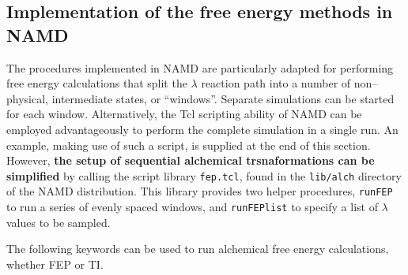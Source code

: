 \subsection{Implementation of the free energy methods in NAMD}
\label{section:fepparameters}


The procedures implemented in NAMD are particularly
adapted for performing free
energy calculations that split the $\lambda$
reaction path into a number of non--physical,
intermediate states, or ``windows''. Separate simulations
can be started for each window.
Alternatively, the {\sc Tcl} scripting ability of
NAMD can be employed advantageously
to perform the complete simulation in a single run.
An example, making use of such a script, is supplied at the end
of this section.
However, \textbf{the setup of sequential alchemical trsnaformations can be
simplified} by calling the script library \texttt{fep.tcl},
found in the \texttt{lib/alch} directory of the NAMD distribution.
This library provides two helper procedures, \texttt{runFEP} to run
a series of evenly spaced windows, and \texttt{runFEPlist} to
specify a list of $\lambda$ values to be sampled.

The following keywords can be used to run alchemical free
energy calculations, whether FEP or TI.


